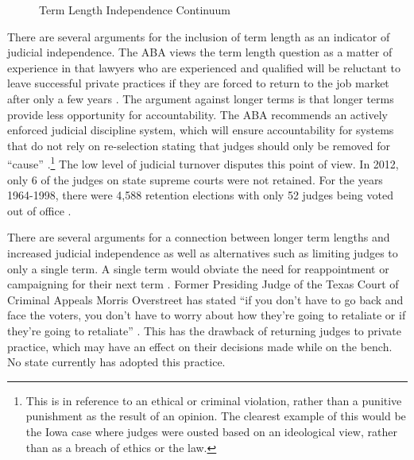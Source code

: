 \documentclass[12pt]{article}
\begin{document}
\begin{figure}[tbh]\centering\caption{Term Length Independence Continuum}\label{termcontinuum}
\end{figure}

There are several arguments for the inclusion of term length as an indicator of judicial independence. The ABA views the term length question as a matter of experience in that lawyers who are experienced and qualified will be reluctant to leave successful private practices if they are forced to return to the job market after only a few years \citep[97]{ABA2003}.   The argument against longer terms is that longer terms provide less opportunity for accountability. The ABA recommends an actively enforced judicial discipline system, which will ensure accountability for systems that do not rely on re-selection stating that judges should only be removed for ``cause'' \citep[103]{ABA2003}.\footnote{This is in reference to an ethical or criminal violation, rather than a punitive punishment as the result of an opinion.  The clearest example of this would be the Iowa case where judges were ousted based on an ideological view, rather than as a breach of ethics or the law.}  The low level of judicial turnover disputes this point of view. In 2012, only 6 of the judges on state supreme courts were not retained. For the years 1964-1998, there were 4,588 retention elections with only 52 judges being voted out of office \citep{Aspin2000}.  

There are several arguments for a connection between longer term lengths and increased judicial independence as well as alternatives such as limiting judges to only a single term. A single term would obviate the need for reappointment or campaigning for their next term \citep{Carrington1998}.  Former Presiding Judge of the Texas Court of Criminal Appeals Morris Overstreet has stated ``if you don't have to go back and face the voters, you don't have to worry about how they're going to retaliate or if they're going to retaliate'' \citep{ABA2003}.  This has the drawback of returning judges to private practice, which may have an effect on their decisions made while on the bench.  No state currently has adopted this practice.
\end{document}
